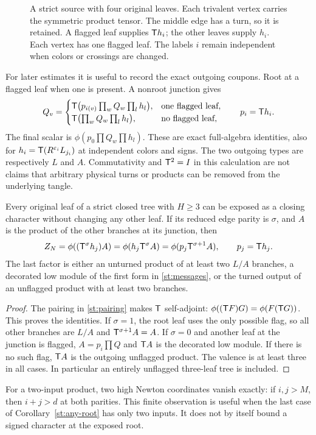 \begin{figure}[ht]
\centering
\caption{A strict source with four original leaves. Each trivalent
vertex carries the symmetric product tensor. The middle edge has
a turn, so it is retained. A flagged leaf supplies $\mathsf T h_i$;
the other leaves supply $h_i$. Each vertex has one flagged
leaf. The labels $i$ remain independent when colors or crossings
are changed.}\label{st:tree-figure}
\end{figure}

For later estimates it is useful to record the exact outgoing
coupons. Root at a flagged leaf when one is present. A
nonroot junction gives
\begin{equation}\label{st:messages}
 Q_v=
 \begin{cases}
 \mathsf T\bigl(p_{i(v)}\prod_wQ_w\prod_lh_l\bigr),
       &\text{one flagged leaf},\\
 \mathsf T\bigl(\prod_wQ_w\prod_lh_l\bigr),
       &\text{no flagged leaf},
 \end{cases}
 \qquad p_i=\mathsf T h_i .
\end{equation}
The final scalar is $\phi(p_0\prod Q_w\prod h_l)$.
These are exact full-algebra identities, also for
$h_i=\mathsf T(R^{\varepsilon_i}L_{j_i})$ at independent colors and signs.
The two outgoing types are respectively $L$ and $A$.
Commutativity and $\mathsf T^2=I$ in this calculation are not
claims that arbitrary physical turns or products can be
removed from the underlying tangle.

\begin{corollary}\label{st:any-root}
Every original leaf of a strict closed tree with $H\ge3$
can be exposed as a closing character without changing
any other leaf. If its reduced edge parity is $\sigma$,
and $A$ is the product of the other branches at its
junction, then
\[
 Z_N=\phi((\mathsf T^\sigma h_j)A)
     =\phi(h_j\mathsf T^\sigma A)
     =\phi(p_j\mathsf T^{\sigma+1}A),\qquad p_j=\mathsf T h_j .
\]
The last factor is either an unturned product of at least
two $L/A$ branches, a decorated low module of the first
form in \eqref{st:messages}, or the turned output of an
unflagged product with at least two branches.
\end{corollary}
\begin{proof}
The pairing in \eqref{st:pairing} makes $\mathsf T$ self-adjoint:
$\phi((\mathsf T F)G)=\phi(F(\mathsf T G))$. This proves the identities.
If $\sigma=1$, the root leaf uses the only possible flag,
so all other branches are $L/A$ and
$\mathsf T^{\sigma+1}A=A$.
If $\sigma=0$ and another leaf at the junction is flagged,
$A=p_i\prod Q$ and $\mathsf T A$ is the decorated low module.
If there is no such flag, $\mathsf T A$ is the outgoing
unflagged product. The valence is at least three in
all cases. In particular an entirely unflagged
three-leaf tree is included.
\end{proof}
For a two-input product, two high Newton coordinates
vanish exactly: if $i,j>M$, then $i+j>d$ at both
parities. This finite observation is useful when the
last case of Corollary~\ref{st:any-root} has only
two inputs. It does not by itself bound a signed
character at the exposed root.
